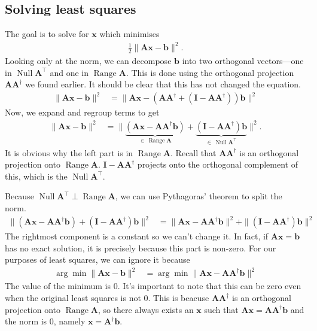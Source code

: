 \documentclass[12pt,a4paper]{article} %
\DeclareMathOperator{\Range}{Range}
\DeclareMathOperator{\Null}{Null}
\begin{document}
\newpage
\subsection{Solving least squares}
The goal is to solve for $\bm x$ which minimises
\begin{align*}
    \frac{1}{2}\| \mathbf A \bm x - \bm b \| ^2.
\end{align*}
Looking only at the norm, we can decompose $\bm b$ into two orthogonal vectors---one in $\Null \mathbf A^\top$ and one 
in $\Range \mathbf A$. This is done using the orthogonal projection $\mathbf A\mathbf A^\dagger$ we found earlier. 
It should be clear that this has not changed the equation. 
\begin{align*}
    \| \mathbf A \bm x - \bm b \| ^2 &= \| \mathbf A \bm x - (\mathbf A \mathbf A^\dagger + (\mathbf I - \mathbf A\mathbf A^\dagger))\bm b \|^2
\end{align*}
Now, we expand and regroup terms to get 
\begin{align*}
    \| \mathbf A \bm x - \bm b \| ^2 &= \| \underbrace{(\mathbf A \bm x - \mathbf A \mathbf A^\dagger \bm b)}_{\in \,\Range \mathbf A} + \underbrace{(\mathbf I - \mathbf A\mathbf A^\dagger)\bm b}_{\in \, \Null \mathbf A^\top} \|^2.
\end{align*}
It is obvious why the left part is in $\Range \mathbf A$. Recall that $\mathbf A \mathbf A^\dagger$ is an orthogonal projection onto $\Range \mathbf A$.
$\mathbf I - \mathbf A \mathbf A^\dagger$ projects onto the orthogonal complement of this, which is the $\Null \mathbf A^\top$.

Because $\Null \mathbf A^\top \perp \Range \mathbf A$, we can use Pythagoras' theorem to split the norm.
\begin{align*}
    \| {(\mathbf A \bm x - \mathbf A \mathbf A^\dagger \bm b)} + {(\mathbf I - \mathbf A\mathbf A^\dagger)\bm b} \|^2
    &= \| {\mathbf A \bm x - \mathbf A \mathbf A^\dagger \bm b} \| ^2 + \| {(\mathbf I - \mathbf A\mathbf A^\dagger)\bm b}  \| ^2
\end{align*}
The rightmost component is a constant so we can't change it. 
In fact, if $\mathbf A \bm x = \bm b$ has no exact solution, 
it is precisely because this part is non-zero. For our purposes of least squares, we can ignore it because 
\begin{align*}
    \arg\min \| \mathbf A \bm x - \bm b \| ^2 &= \arg \min \| {\mathbf A \bm x - \mathbf A \mathbf A^\dagger \bm b} \| ^2
\end{align*}
The value of the minimum is 0. 
It's important to note that this can be zero even when 
the original least squares is not 0. This is beacuse $\mathbf A \mathbf A^\dagger$ is an orthogonal projection onto 
$\Range \mathbf A$, so there always exists  an $\bm x$ such that $\mathbf A \bm x = \mathbf A \mathbf A^\dagger \bm b$ and the 
norm is 0, namely $\bm x = \mathbf A^\dagger \bm b$.
\end{document}
